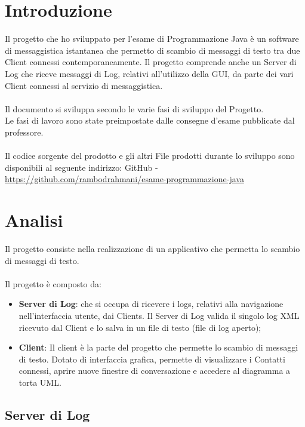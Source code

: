 \documentclass[a4paper, 11pt]{article} %
\begin{document}
\newpage
\section{Introduzione}

Il progetto che ho sviluppato per l'esame di Programmazione Java \`e un software di messaggistica istantanea che permetto di scambio di messaggi di testo tra due Client connessi contemporaneamente. Il progetto comprende anche un Server di Log che riceve messaggi di Log, relativi all'utilizzo della GUI, da parte dei vari Client connessi al servizio di messaggistica.\\
\\
Il documento si sviluppa secondo le varie fasi di sviluppo del Progetto.\\
Le fasi di lavoro sono state preimpostate dalle consegne d'esame pubblicate dal professore.\\
\\
Il codice sorgente del prodotto e gli altri File prodotti durante lo sviluppo sono disponibili al seguente indirizzo: GitHub - \textcolor{blue}{\url{https://github.com/rambodrahmani/esame-programmazione-java}}


\newpage
\section{Analisi}

Il progetto consiste nella realizzazione di un applicativo che permetta lo scambio di messaggi di testo.\\
\\
Il progetto \`e composto da:
\begin{itemize}
\item \textbf{Server di Log}: che si occupa di ricevere i logs, relativi alla navigazione nell'interfaccia utente, dai Clients. Il Server di Log valida il singolo log XML ricevuto dal Client e lo salva in un file di testo (file di log aperto);
\item \textbf{Client}: Il client \`e la parte del progetto che permette lo scambio di messaggi di testo. Dotato di interfaccia grafica, permette di visualizzare i Contatti connessi, aprire nuove finestre di conversazione e accedere al diagramma a torta UML.
\end{itemize}

\subsection{Server di Log}
\end{document}
